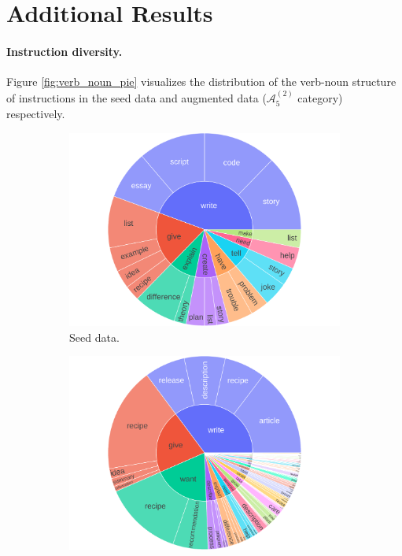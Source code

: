 \clearpage



\section{Additional Results}
\label{appendix:additional_analysis}

\paragraph{Instruction diversity.}  Figure \ref{fig:verb_noun_pie} visualizes the distribution of the verb-noun structure of instructions in the seed data and augmented data ($\mathcal{A}_5^{(2)}$ category) respectively. 
\begin{figure}[t]
\centering
\hfill
\begin{subfigure}[t]{0.495\textwidth}
\includegraphics[width=\textwidth]{figs/verb_noun_oa_single_first.pdf}
\caption{Seed data.}
\label{fig:seed_verb_noun}
\end{subfigure}
\begin{subfigure}[t]{0.495\textwidth}
\centering
\includegraphics[width=\textwidth]{figs/verb_noun_cw_oabt_scored_p20_all_51200.pdf}

\end{subfigure}
\end{figure}
